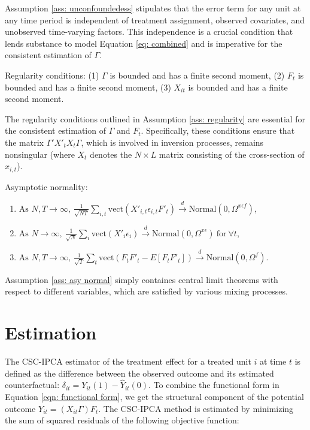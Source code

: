 \documentclass[12pt]{article}
\begin{document}
Assumption \ref{ass: unconfoundedess} stipulates that the error term for any unit at any time period is independent of treatment assignment, observed covariates, and unobserved time-varying factors. This independence is a crucial condition that lends substance to model Equation \ref{eq: combined} and is imperative for the consistent estimation of $\Gamma$.

\begin{assumption}
Regularity conditions: (1) $\Gamma$ is bounded and has a finite second moment, (2) $F_t$ is bounded and has a finite second moment, (3) $X_{it}$ is bounded and has a finite second moment.
\label{ass: regularity}
\end{assumption}

The regularity conditions outlined in Assumption \ref{ass: regularity} are essential for the consistent estimation of $\Gamma$ and $F_{t}$. Specifically, these conditions ensure that the matrix $\Gamma'X'_tX_t\Gamma$, which is involved in inversion processes, remains nonsingular (where $X_t$ denotes the $N \times L$ matrix consisting of the cross-section of $x_{i,t}$).

\begin{assumption}
Asymptotic normality:
\begin{enumerate}
\renewcommand*\labelenumi{(\theenumi)}
\item $\text{As } N, T \to \infty, \: \frac{1}{\sqrt{NT}} \sum_{i,t} \text{vect}\left( X'_{i,t} \epsilon_{i,t} F'_{t} \right) \xrightarrow{d} \text{Normal} \left(0, \Omega^{x\epsilon f} \right)$,
\item $\text{As } N \to \infty, \: \frac{1}{\sqrt{N}} \sum_{i} \text{vect}\left( X'_{i} \epsilon_{i} \right) \xrightarrow{d} \text{Normal} \left(0, \Omega^{x\epsilon} \right) \: \text{for} \: \forall t$,
\item $\text{As } N, T \to \infty, \: \frac{1}{\sqrt{T}} \sum_{t} \text{vect}\left( F_{t}F'_{t} - E[F_{t}F'_{t}] \right) \xrightarrow{d} \text{Normal} \left(0, \Omega^{f} \right)$.
\end{enumerate}
\label{ass: asy normal}
\end{assumption}

Assumption \ref{ass: asy normal} simply containes central limit theorems with respect to different variables, which are satisfied by various mixing processes.

\section{Estimation}
\label{sec: estimation}
The CSC-IPCA estimator of the treatment effect for a treated unit $i$ at time $t$ is defined as the difference between the observed outcome and its estimated counterfactual: $\delta_{it} = Y_{it}(1) - \hat{Y}_{it}(0)$. To combine the functional form in Equation \ref{eqn: functional form}, we get the structural component of the potential outcome $Y_{it} = (X_{it}\Gamma) F_{t}$. The CSC-IPCA method is estimated by minimizing the sum of squared residuals of the following objective function:
\end{document}
